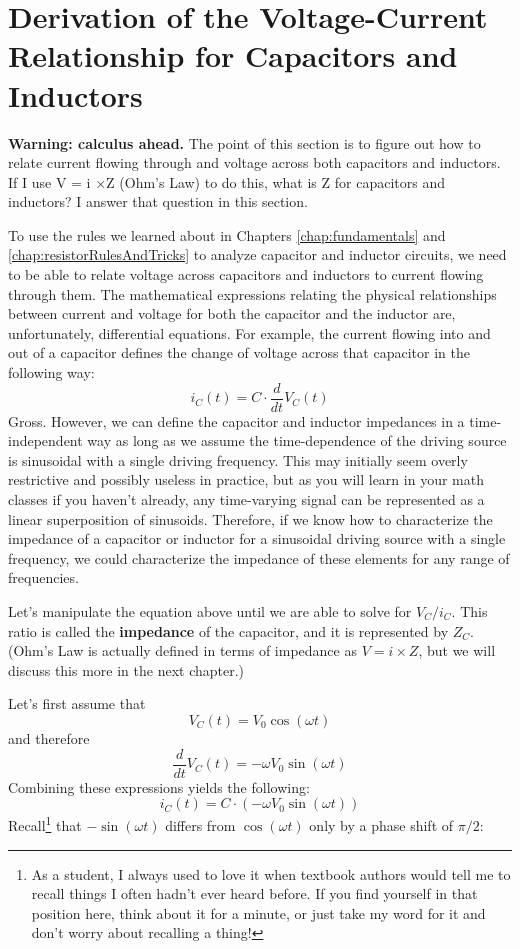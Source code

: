 \section{Derivation of the Voltage-Current Relationship for Capacitors and Inductors}
\textbf{Warning: calculus ahead.} The point of this section is to figure out how to relate current flowing through and voltage across both capacitors and inductors. If I use V = i $\times$Z (Ohm's Law) to do this, what is Z for capacitors and inductors? I answer that question in this section.
\par
To use the rules we learned about in Chapters \ref{chap:fundamentals} and \ref{chap:resistorRulesAndTricks} to analyze capacitor and inductor circuits, we need to be able to relate voltage across capacitors and inductors to current flowing through them. The mathematical expressions relating the physical relationships between current and voltage for both the capacitor and the inductor are, unfortunately, differential equations. For example, the current flowing into and out of a capacitor defines the change of voltage across that capacitor in the following way:
$$
i_C(t) = C \cdot \frac{d}{dt}V_C(t)
$$
Gross. However, we can define the capacitor and inductor impedances in a time-independent way as long as we assume the time-dependence of the driving source is sinusoidal with a single driving frequency. This may initially seem overly restrictive and possibly useless in practice, but as you will learn in your math classes if you haven't already, any time-varying signal can be represented as a linear superposition of sinusoids. Therefore, if we know how to characterize the impedance of a capacitor or inductor for a sinusoidal driving source with a single frequency, we could characterize the impedance of these elements for any range of frequencies.
\par
Let's manipulate the equation above until we are able to solve for $V_C/i_C$. This ratio is called the \textbf{impedance} of the capacitor, and it is represented by $Z_C$. (Ohm's Law is actually defined in terms of impedance as $V=i\times Z$, but we will discuss this more in the next chapter.)
\par
Let's first assume that 
$$
V_C(t) = V_0\cos(\omega t)
$$
and therefore 
$$
\frac{d}{dt}V_C(t)=-\omega V_0 \sin(\omega t)
$$
Combining these expressions yields the following:
$$
i_C(t) = C \cdot \left(-\omega V_0 \sin(\omega t)\right)
$$
Recall\footnote{As a student, I always used to love it when textbook authors would tell me to recall things I often hadn't ever heard before. If you find yourself in that position here, think about it for a minute, or just take my word for it and don't worry about recalling a thing!} that $-\sin(\omega t)$ differs from $\cos(\omega t)$ only by a phase shift of $\pi/2$:
